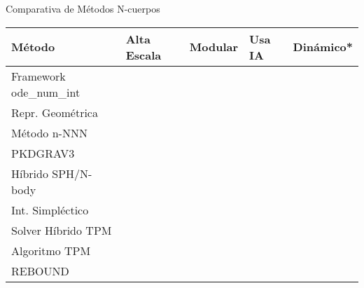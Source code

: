 \begin{frame}{Comparativa de Métodos N-cuerpos}
    \centering
    \label{tab:comparativa}
    \vspace{-0.1cm}
    \begin{adjustbox}{max width=1\textwidth,max height=0.4\textheight, keepaspectratio}
        \renewcommand{\arraystretch}{1.3}
            \begin{tabular}{>{
            \raggedright\arraybackslash}p{5.2cm}
            >{\centering\arraybackslash}p{3.2cm}
            >{\centering\arraybackslash}p{3.2cm}
            >{\centering\arraybackslash}p{3.2cm}
            >{\centering\arraybackslash}p{3.5cm}
            }
                \toprule
                \textbf{Método} & \textbf{Alta Escala} & \textbf{Modular} & \textbf{Usa IA} & \textbf{Dinámico*} \\
                \midrule
                Framework ode\_num\_int & \color{red}{\xmark} & \color{green}{\checkmark} & \color{red}{\xmark} & \color{red}{\xmark} \\
                \midrule
                Repr. Geométrica & \color{green}{\checkmark} & \color{red}{\xmark} & \color{red}{\xmark} & \color{red}{\xmark} \\
                \midrule
                Método n-NNN & \color{green}{\checkmark} & \color{red}{\xmark} & \color{green}{\checkmark} & \color{red}{\xmark} \\
                \midrule
                PKDGRAV3 & \color{green}{\checkmark} & \color{red}{\xmark} & \color{red}{\xmark} & \color{red}{\xmark} \\
                \midrule
                Híbrido SPH/N-body & \color{green}{\checkmark} & \color{green}{\checkmark} & \color{red}{\xmark} & \color{red}{\xmark} \\
                \midrule
                Int. Simpléctico & \color{red}{\xmark} & \color{green}{\checkmark} & \color{red}{\xmark} & \color{red}{\xmark} \\
                \midrule
                Solver Híbrido TPM & \color{green}{\checkmark} & \color{red}{\xmark} & \color{red}{\xmark} & \color{red}{\xmark} \\
                \midrule
                Algoritmo TPM & \color{green}{\checkmark} & \color{red}{\xmark} & \color{red}{\xmark} & \color{red}{\xmark} \\
                \midrule
                REBOUND & \color{green}{\checkmark} & \color{green}{\checkmark} & \color{red}{\xmark} & \color{red}{\xmark} \\

\end{tabular}
\end{adjustbox}
\end{frame}
